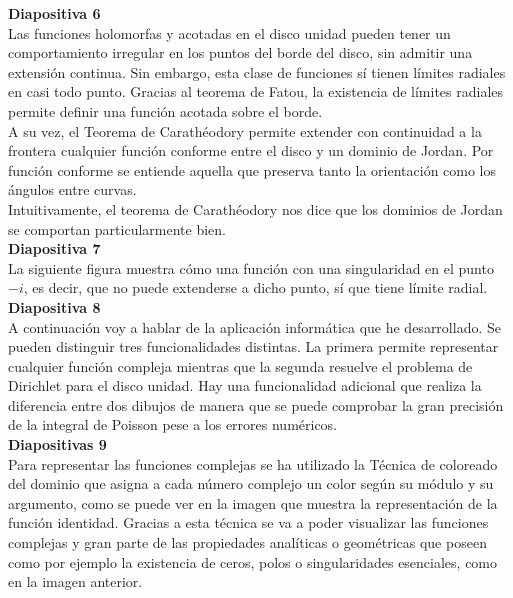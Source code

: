 \documentclass[spanish, a4paper, 12pt]{article}
\begin{document}
\textbf{Diapositiva 6} \\

Las funciones holomorfas y acotadas en el disco unidad pueden tener un comportamiento irregular en los puntos del borde del disco, sin admitir una extensión continua. Sin embargo, esta clase de funciones sí tienen límites radiales en casi todo punto. Gracias al teorema de Fatou, la existencia de límites radiales permite definir una función acotada sobre el borde. \\

A su vez, el Teorema de Carathéodory permite extender con continuidad a la frontera cualquier función conforme entre el disco y un dominio de Jordan. Por función conforme se entiende aquella que preserva tanto la orientación como los ángulos entre curvas.\\

Intuitivamente, el teorema de Carathéodory nos dice que los dominios de Jordan se comportan particularmente bien. \\

\textbf{Diapositiva 7} \\

La siguiente figura muestra cómo una función con una singularidad en el punto $-i$, es decir, que no puede extenderse a dicho punto, sí que tiene límite radial. \\

\textbf{Diapositiva 8} \\

A continuación voy a hablar de la aplicación informática que he desarrollado. Se pueden distinguir tres funcionalidades distintas. La primera permite representar cualquier función compleja mientras que la segunda resuelve el problema de Dirichlet para el disco unidad. Hay una funcionalidad adicional que realiza la diferencia entre dos dibujos de manera que se puede comprobar la gran precisión de la integral de Poisson pese a los errores numéricos. \\

\textbf{Diapositivas 9} \\

Para representar las funciones complejas se ha utilizado la Técnica de coloreado del dominio que asigna a cada número complejo un color según su módulo y su argumento, como se puede ver en la imagen que muestra la representación de la función identidad. Gracias a esta técnica se va a poder visualizar las funciones complejas y gran parte de las propiedades analíticas o geométricas que poseen como por ejemplo la existencia de ceros, polos o singularidades esenciales, como en la imagen anterior. \\
\end{document}
